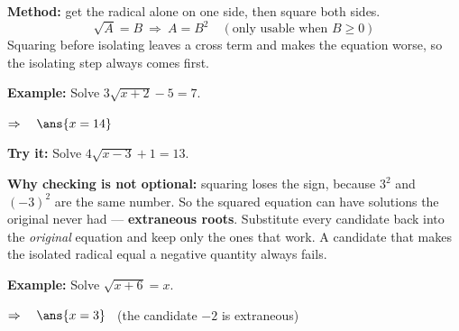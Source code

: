 \documentclass[12pt]{article}
\begin{document}


\begin{formulabox}
\textbf{Method:} get the radical alone on one side, then square both sides.
\[ \sqrt{A} = B \ \Longrightarrow \ A = B^2 \quad (\text{only usable when } B \ge 0) \]
Squaring before isolating leaves a cross term and makes the equation worse, so
the isolating step always comes first.
\end{formulabox}

\begin{examplebox}
\textbf{Example:} \quad Solve $3\sqrt{x+2} - 5 = 7$.

$\Rightarrow\quad \ans{x = 14}$
\end{examplebox}

\begin{tryitbox}
\textbf{Try it:} \quad Solve $4\sqrt{x-3} + 1 = 13$.\\[2pt]
\end{tryitbox}


\begin{formulabox}
\textbf{Why checking is not optional:} squaring loses the sign, because $3^2$ and
$(-3)^2$ are the same number. So the squared equation can have solutions the
original never had --- \textbf{extraneous roots}. Substitute every candidate back
into the \emph{original} equation and keep only the ones that work. A candidate
that makes the isolated radical equal a negative quantity always fails.
\end{formulabox}

\begin{examplebox}
\textbf{Example:} \quad Solve $\sqrt{x+6} = x$.

$\Rightarrow\quad \ans{x = 3}$ \ (the candidate $-2$ is extraneous)
\end{examplebox}
\end{document}
